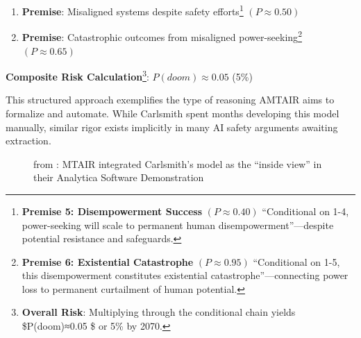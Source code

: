 \documentclass[
  11pt,
  letterpaper,
]{book}
\begin{document}
\begin{enumerate}
{    arguments.} \((P≈0.65)\)
\item
  \textbf{Premise}: Misaligned systems despite safety efforts\footnote{\textbf{Premise
    5: Disempowerment Success} \((P≈0.40)\) ``Conditional on 1-4,
    power-seeking will scale to permanent human
    disempowerment''---despite potential resistance and safeguards.}
  \((P≈0.50)\)
\item
  \textbf{Premise}: Catastrophic outcomes from misaligned
  power-seeking\footnote{\textbf{Premise 6: Existential Catastrophe}
    \((P≈0.95)\) ``Conditional on 1-5, this disempowerment constitutes
    existential catastrophe''---connecting power loss to permanent
    curtailment of human potential.} \((P≈0.65)\)
\end{enumerate}

\textbf{Composite Risk Calculation}\footnote{\textbf{Overall Risk}:
  Multiplying through the conditional chain yields \$P(doom)≈0.05 \$ or
  5\% by 2070.}: \(P(doom)≈0.05\) (5\%)

This structured approach exemplifies the type of reasoning AMTAIR aims
to formalize and automate. While Carlsmith spent months developing this
model manually, similar rigor exists implicitly in many AI safety
arguments awaiting extraction.

\begin{figure}


\caption[Base APS causal map
(clean)]{\label{fig-mtair-insideoutside-base}from
\textcite{manheim2021}: MTAIR integrated Carlsmith's model as the
``inside view'' in their Analytica Software Demonstration}

\end{figure}%
\end{document}
